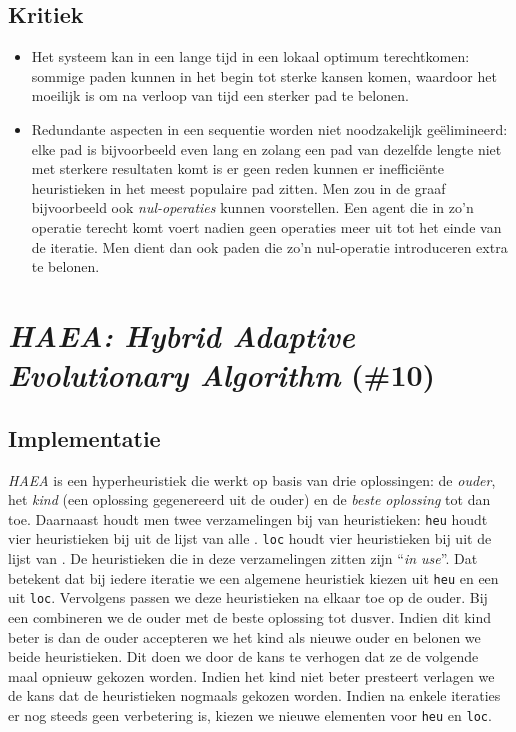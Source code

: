 \subsection{Kritiek}
\begin{itemize}
 \item Het systeem kan in een lange tijd in een lokaal optimum terechtkomen: sommige paden kunnen in het begin tot sterke kansen komen, waardoor het moeilijk is om na verloop van tijd een sterker pad te belonen.
 \item Redundante aspecten in een sequentie worden niet noodzakelijk ge\"elimineerd: elke pad is bijvoorbeeld even lang en zolang een pad van dezelfde lengte niet met sterkere resultaten komt is er geen reden kunnen er ineffici\"ente heuristieken in het meest populaire pad zitten. Men zou in de graaf bijvoorbeeld ook \emph{nul-operaties} kunnen voorstellen. Een agent die in zo'n operatie terecht komt voert nadien geen operaties meer uit tot het einde van de iteratie. Men dient dan ook paden die zo'n nul-operatie introduceren extra te belonen.
\end{itemize}
\section{\emph{HAEA: Hybrid Adaptive Evolutionary Algorithm} (\#10)}
\label{sss:haea}
\subsection{Implementatie}
\emph{HAEA}\cite{chesc-haea,Gomez04selfadaptation} is een hyperheuristiek die werkt op basis van drie oplossingen: de \emph{ouder}, het \emph{kind} (een oplossing gegenereerd uit de ouder) en de \emph{beste oplossing} tot dan toe. Daarnaast houdt men twee verzamelingen bij van heuristieken: \texttt{heu} houdt vier heuristieken bij uit de lijst van alle \abllhn{}. \texttt{loc} houdt vier heuristieken bij uit de lijst van \abls{} \abllhn{}. De heuristieken die in deze verzamelingen zitten zijn ``\emph{in use}''. Dat betekent dat bij iedere iteratie we een algemene heuristiek kiezen uit \texttt{heu} en een \abls{} \abllh{} uit \texttt{loc}. Vervolgens passen we deze heuristieken na elkaar toe op  de ouder. Bij een \abco{} \abllh{} combineren we de ouder met de beste oplossing tot dusver. Indien dit kind beter is dan de ouder accepteren we het kind als nieuwe ouder en belonen we beide heuristieken. Dit doen we door de kans te verhogen dat ze de volgende maal opnieuw gekozen worden. Indien het kind niet beter presteert verlagen we de kans dat de heuristieken nogmaals gekozen worden. Indien na enkele iteraties er nog steeds geen verbetering is, kiezen we nieuwe elementen voor \texttt{heu} en \texttt{loc}.
